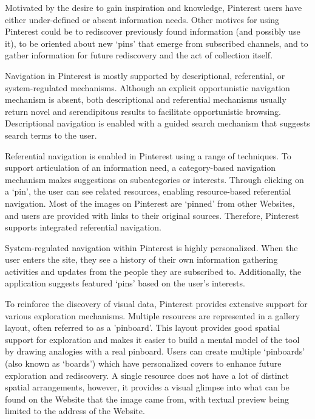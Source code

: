 \documentclass{sigchi}
\newcommand{\feature}[1]{{\ttfamily#1}}
\begin{document}
{{Motivated by the desire to gain inspiration and knowledge, Pinterest users have either under-defined or absent information needs. Other motives for using Pinterest could be to rediscover previously found information (and possibly use it), to be oriented about new `pins' that emerge from subscribed channels, and to gather information for future rediscovery and the act of collection itself.

Navigation in Pinterest is mostly supported by descriptional, referential, or system-regulated mechanisms. Although an explicit \feature{opportunistic navigation mechanism} is absent, both descriptional and referential mechanisms usually return novel and serendipitous results to facilitate opportunistic browsing. Descriptional navigation is enabled with a \feature{guided search} mechanism that suggests search terms to the user. 

Referential navigation is enabled in Pinterest using a range of techniques. To support articulation of an information need, a \feature{category-based} navigation mechanism makes suggestions on subcategories or interests. Through clicking on a `pin', the user can see related resources, enabling \feature{resource-based} referential navigation. Most of the images on Pinterest are `pinned' from other Websites, and users are provided with links to their original sources. Therefore, Pinterest supports \feature{integrated} referential navigation.

System-regulated navigation within Pinterest is highly personalized. When the user enters the site, they see a history of their own information gathering activities and updates from the people they are subscribed to. Additionally, the application suggests \feature{featured} `pins' based on the user's interests.

To reinforce the discovery of visual data, Pinterest provides extensive support for various exploration mechanisms. Multiple resources are represented in a \feature{gallery layout}, often referred to as a 'pinboard'. This layout provides good spatial support for exploration and makes it easier to build a mental model of the tool by drawing analogies with a real pinboard. Users can create multiple `pinboards' (also known as `boards') which have \feature{personalized} covers to enhance future exploration and rediscovery.
%
A single resource does not have a lot of distinct spatial arrangements, however, it provides a visual glimpse into what can be found on the Website that the image came from, with \feature{textual preview} being limited to the address of the Website. 

}}
\end{document}
